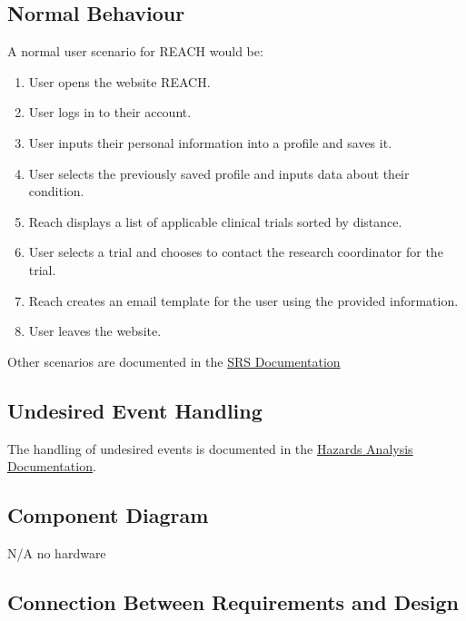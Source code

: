 \documentclass[12pt, titlepage]{article}
\begin{document}
\subsection{Normal Behaviour}

A normal user scenario for REACH would be:

\begin{enumerate}
  \item User opens the website REACH.

  \item User logs in to their account.

  \item User inputs their personal information into a profile and saves it.
  
  \item User selects the previously saved profile and inputs data about their condition.
  
  \item Reach displays a list of applicable clinical trials sorted by distance.
  
  \item User selects a trial and chooses to contact the research coordinator for the trial.
  
  \item Reach creates an email template for the user using the provided information.
  
  \item User leaves the website.
\end{enumerate}

\noindent
Other scenarios are documented in the \href{https://github.com/davimang/REACH/blob/main/docs/SRS/SRS.pdf}{SRS Documentation}

\subsection{Undesired Event Handling}

The handling of undesired events is documented in the \href{https://github.com/davimang/REACH/blob/main/docs/HazardAnalysis/HazardAnalysis.pdf}{Hazards Analysis Documentation}.

\subsection{Component Diagram}

N/A no hardware

\subsection{Connection Between Requirements and Design} \label{SecConnection}
\end{document}
